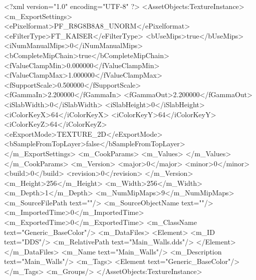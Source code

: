 <?xml version="1.0" encoding="UTF-8" ?>
<AssetObjects:TextureInstance>
<m_ExportSettings>
<ePixelformat>PF_R8G8B8A8_UNORM</ePixelformat>
<eFilterType>FT_KAISER</eFilterType>
<bUseMips>true</bUseMips>
<iNumManualMips>0</iNumManualMips>
<bCompleteMipChain>true</bCompleteMipChain>
<fValueClampMin>0.000000</fValueClampMin>
<fValueClampMax>1.000000</fValueClampMax>
<fSupportScale>0.500000</fSupportScale>
<fGammaIn>2.200000</fGammaIn>
<fGammaOut>2.200000</fGammaOut>
<iSlabWidth>0</iSlabWidth>
<iSlabHeight>0</iSlabHeight>
<iColorKeyX>64</iColorKeyX>
<iColorKeyY>64</iColorKeyY>
<iColorKeyZ>64</iColorKeyZ>
<eExportMode>TEXTURE_2D</eExportMode>
<bSampleFromTopLayer>false</bSampleFromTopLayer>
</m_ExportSettings>
<m_CookParams>
<m_Values>
</m_Values>
</m_CookParams>
<m_Version>
<major>0</major>
<minor>0</minor>
<build>0</build>
<revision>0</revision>
</m_Version>
<m_Height>256</m_Height>
<m_Width>256</m_Width>
<m_Depth>1</m_Depth>
<m_NumMipMaps>9</m_NumMipMaps>
<m_SourceFilePath text=""/>
<m_SourceObjectName text=""/>
<m_ImportedTime>0</m_ImportedTime>
<m_ExportedTime>0</m_ExportedTime>
<m_ClassName text="Generic_BaseColor"/>
<m_DataFiles>
<Element>
<m_ID text="DDS"/>
<m_RelativePath text="Main_Walls.dds"/>
</Element>
</m_DataFiles>
<m_Name text="Main_Walls"/>
<m_Description text="Main_Walls"/>
<m_Tags>
<Element text="Generic_BaseColor"/>
</m_Tags>
<m_Groups/>
</AssetObjects:TextureInstance>
